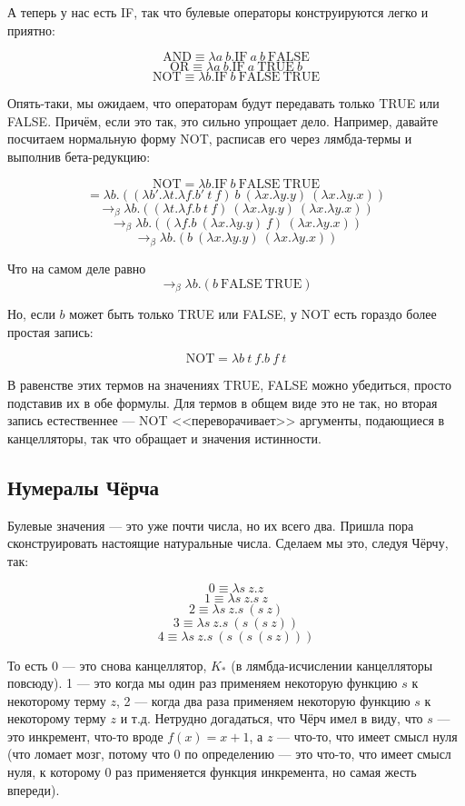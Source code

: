 \documentclass[a5paper]{article}
\begin{document}
А теперь у нас есть IF, так что булевые операторы конструируются легко и приятно:

$$\mbox{AND} \equiv \lambda a\ b. \mbox{IF}\ a\ b\ \mbox{FALSE}$$
$$\mbox{OR} \equiv \lambda a\ b. \mbox{IF}\ a\ \mbox{TRUE}\ b$$
$$\mbox{NOT} \equiv \lambda b.\mbox{IF}\ b\ \mbox{FALSE}\ \mbox{TRUE}$$

Опять-таки, мы ожидаем, что операторам будут передавать только TRUE или FALSE. Причём, если это так, это сильно упрощает дело. Например, давайте посчитаем нормальную форму NOT, расписав его через лямбда-термы и выполнив бета-редукцию:

$$\mbox{NOT} = \lambda b.\mbox{IF}\ b\ \mbox{FALSE}\ \mbox{TRUE}$$
$$= \lambda b.((\lambda b'.\lambda t.\lambda f.b'\ t\ f)\ b\ (\lambda x.\lambda y.y)\ (\lambda x.\lambda y.x))$$
$$\rightarrow_\beta \lambda b.((\lambda t.\lambda f.b\ t\ f)\ (\lambda x.\lambda y.y)\ (\lambda x.\lambda y.x))$$
$$\rightarrow_\beta \lambda b.((\lambda f.b\ (\lambda x.\lambda y.y)\ f)\ (\lambda x.\lambda y.x))$$
$$\rightarrow_\beta \lambda b.(b\ (\lambda x.\lambda y.y)\ (\lambda x.\lambda y.x))$$

Что на самом деле равно
$$\rightarrow_\beta \lambda b.(b\ \mbox{FALSE}\ \mbox{TRUE})$$

Но, если $b$ может быть только TRUE или FALSE, у NOT есть гораздо более простая запись:

$$\mbox{NOT} = \lambda b\ t\ f.b\ f\ t$$

В равенстве этих термов на значениях TRUE, FALSE можно убедиться, просто подставив их в обе формулы. Для термов в общем виде это не так, но вторая запись естественнее --- NOT <<переворачивает>> аргументы, подающиеся в канцелляторы, так что обращает и значения истинности.

\subsection{Нумералы Чёрча}

Булевые значения --- это уже почти числа, но их всего два. Пришла пора сконструировать настоящие натуральные числа. Сделаем мы это, следуя Чёрчу, так:

$$0 \equiv \lambda s\ z.z$$
$$1 \equiv \lambda s\ z.s\ z$$
$$2 \equiv \lambda s\ z.s\ (s\ z)$$
$$3 \equiv \lambda s\ z.s\ (s\ (s\ z))$$
$$4 \equiv \lambda s\ z.s\ (s\ (s\ (s\ z)))$$

То есть 0 --- это снова канцеллятор, $K_\ast$ (в лямбда-исчислении канцелляторы повсюду). 1 --- это когда мы один раз применяем некоторую функцию $s$ к некоторому терму $z$, 2 --- когда два раза применяем некоторую функцию $s$ к некоторому терму $z$ и т.д. Нетрудно догадаться, что Чёрч имел в виду, что $s$ --- это инкремент, что-то вроде $f(x) = x + 1$, а $z$ --- что-то, что имеет смысл нуля (что ломает мозг, потому что 0 по определению --- это что-то, что имеет смысл нуля, к которому 0 раз применяется функция инкремента, но самая жесть впереди).
\end{document}
